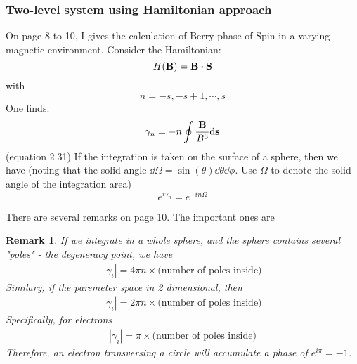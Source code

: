 \documentclass{article}
\numberwithin{equation}{subsection} %
\newtheorem{remark}{Remark}[section]
\theoremstyle{definition}
\begin{document}
        \subsubsection{Two-level system using Hamiltonian approach}
        \label{sec:Two-level-system-using-Hamiltonian-approach}
        On page 8 to 10, I gives the calculation of Berry phase of
        Spin in a varying magnetic environment. Consider the
        Hamiltonian:
        \begin{equation}
            H(\vb{B}) = \vb{B}\vdot \vb{S} 
        \end{equation}
        with
        \begin{equation}
            n = -s, -s+1,\cdots, s
        \end{equation}
        One finds:
        \begin{align}
            \gamma_n = - n\oint \frac{\vb{B}}{B^3} \dd\vb{s}
        \end{align}
        (equation 2.31)
        If the integration is taken on the surface of a sphere, then
        we have (noting that the solid angle $\dd
        \Omega=\sin(\theta)\dd\theta\dd\phi$. Use $\Omega$ to denote
        the solid angle of the integration area)
        \begin{equation}
            e^{i\gamma_n} = e^{-i n \Omega}
        \end{equation}

        There are several remarks on page 10. The important ones are
        \begin{remark}
            If we integrate in a whole sphere, and the sphere contains
            several "poles" - the degeneracy point, we have
            \begin{align}
                |\gamma_i| = 4\pi n \times \text{(number of poles
                inside)}
            \end{align}
            Similary, if the paremeter space in 2 dimensional, then
            \begin{align}
                |\gamma_i| = 2\pi n \times \text{(number of poles
                inside)}
            \end{align}
            Specifically, for electrons
            \begin{align}
                |\gamma_i| = \pi \times \text{(number of poles
                inside)}
            \end{align}
            Therefore, an electron transversing a circle will
            accumulate a phase of $e^{i\pi}=-1$.
        \end{remark}
\end{document}
